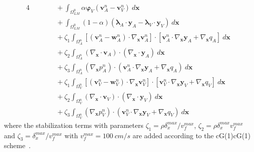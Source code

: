 \documentclass[3p]{elsarticle}
\begin{document}
\begin{alignat}{4}
        &\quad\qquad + \int_{\Omega_{LM}^0} \alpha \boldsymbol{\varphi}_V \left( \boldsymbol{v}_A^n - \boldsymbol{v}_V^n \right)~d\boldsymbol{x} \nonumber \\
        &\quad\qquad + \int_{\Omega_{LM}^0} (1 - \alpha) \left( \boldsymbol{\lambda}_A \cdot \boldsymbol{y}_A - \boldsymbol{\lambda}_V \cdot \boldsymbol{y}_V \right)~d\boldsymbol{x} \nonumber \\
        &\quad\qquad + \zeta_1 \int_{\Omega_A^n} \left[
        \left( \boldsymbol{v}_A^n - \boldsymbol{w}_A^n \right) \cdot \nabla_{\boldsymbol{x}} \boldsymbol{v}_A^n
    \right] \cdot \left[
        \boldsymbol{v}_A^n \cdot \nabla_{\boldsymbol{x}} \boldsymbol{y}_A + \nabla_{\boldsymbol{x}} q_A
    \right]~d\boldsymbol{x} \nonumber \\
    &\quad\qquad + \zeta_2 \int_{\Omega_A^n} \left( \nabla_{\boldsymbol{x}} \cdot \boldsymbol{v}_A \right)
    \cdot \left( \nabla_{\boldsymbol{x}} \cdot \boldsymbol{y}_A \right)~d\boldsymbol{x} \nonumber \\
    &\quad\qquad + \zeta_3 \int_{\Omega_A^n} \left( \nabla_{\boldsymbol{x}} p_A^n \right)
    \cdot \left( \boldsymbol{v}_A^n \cdot \nabla_{\boldsymbol{x}} \boldsymbol{y}_A + \nabla_{\boldsymbol{x}} q_A \right)~d\boldsymbol{x} \nonumber \\
        &\quad\qquad + \zeta_1 \int_{\Omega_V^n} \left[
        \left( \boldsymbol{v}_V^n - \boldsymbol{w}_V^n \right) \cdot \nabla_{\boldsymbol{x}} \boldsymbol{v}_V^n
    \right] \cdot \left[
        \boldsymbol{v}_V^n \cdot \nabla_{\boldsymbol{x}} \boldsymbol{y}_V + \nabla_{\boldsymbol{x}} q_V
    \right]~d\boldsymbol{x} \nonumber \\
    &\quad\qquad + \zeta_2 \int_{\Omega_V^n} \left( \nabla_{\boldsymbol{x}} \cdot \boldsymbol{v}_V \right)
    \cdot \left( \nabla_{\boldsymbol{x}} \cdot \boldsymbol{y}_V \right)~d\boldsymbol{x} \nonumber \\
    &\quad\qquad + \zeta_3 \int_{\Omega_V^n} \left( \nabla_{\boldsymbol{x}} p_V^n \right)
    \cdot \left( \boldsymbol{v}_V^n \cdot \nabla_{\boldsymbol{x}} \boldsymbol{y}_V + \nabla_{\boldsymbol{x}} q_V \right)~d\boldsymbol{x}
    \label{lv-weak-form-cG1cG1-eqn}
\end{alignat}
where the stabilization terms with parameters
$\zeta_1 = \rho \delta_x^{max} / v_f^{max}$,
$\zeta_2 = \rho \delta_x^{max} v_f^{max}$
and $\zeta_3 = \delta_x^{max} / v_f^{max}$
with $v_f^{max} = 100~cm / s$
are added according to the cG(1)cG(1) scheme~\cite{HoffmanJanssonDeabreu2011}.
\end{document}
